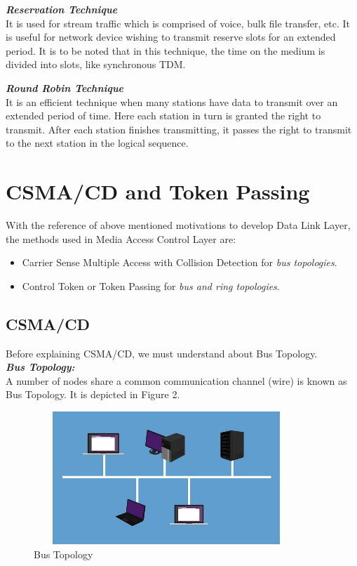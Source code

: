 \documentclass[12pt]{article}
\begin{document}
\begin{enumerate}[label=(\alph*)]
    \textbf{\textit{Reservation Technique}} \\
    It is used for stream traffic which is comprised of voice, bulk file transfer, etc. It is useful for network device wishing to transmit reserve slots for an extended period. It is to be noted that in this technique, the time on the medium is divided into slots, like synchronous TDM.
    
    \textbf{\textit{Round Robin Technique}} \\
    It is an efficient technique when many stations have data to transmit over an extended period of time. Here each station in turn is granted the right to transmit. After each station finishes transmitting, it passes the right to transmit to the next station in the logical sequence.
    
\end{enumerate}


\section{CSMA/CD and Token Passing}
With the reference of above mentioned motivations to develop Data Link Layer, the methods used in Media Access Control Layer are: 
\begin{itemize}
    \item Carrier Sense Multiple Access with Collision Detection for \textit{bus topologies}.
    \item Control Token or Token Passing for \textit{bus and ring topologies}.
\end{itemize}

\subsection{CSMA/CD}
Before explaining CSMA/CD, we must understand about Bus Topology. \\
\textbf{\textit{Bus Topology:}} \\
A number of nodes share a common communication channel (wire) is known as Bus Topology. It is depicted in Figure 2.

\begin{figure}
    \centering
    \includegraphics[width=10cm, height=5cm]{bus.png}
    \caption{Bus Topology}
\end{figure}
\end{document}
